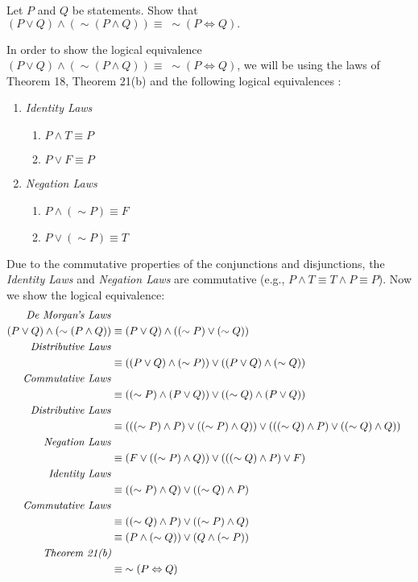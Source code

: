 \documentclass[12pt]{article}
\newenvironment{problem}[2][Problem]{\begin{trivlist}
		\item[\hskip \labelsep {\bfseries #1}\hskip \labelsep {\bfseries #2.}]}{\end{trivlist}}
\newenvironment{solution}[2][Solution]{\begin{trivlist}
		\item[\hskip \labelsep {\bfseries #1}\hskip \labelsep {\bfseries #2.}]}{\end{trivlist}}
\begin{document}
\begin{problem}{62}
	Let $P$ and $Q$ be statements. Show that $(P\vee Q)\wedge (\sim(P \wedge Q))\equiv \; \sim(P\Leftrightarrow Q).$
	\begin{solution}{}
		In order to show the logical equivalence $(P\vee Q)\wedge (\sim(P \wedge Q))\equiv \; \sim(P\Leftrightarrow Q)$, we will be using the laws of Theorem 18, Theorem 21(b) and the following logical equivalences \cite{logicalequiv}:
		\begin{enumerate}
			\item \emph{Identity Laws}
			\begin{enumerate}[label = \alph*]
				\item $P\wedge T \equiv P$
				\item $P \vee F \equiv P$
			\end{enumerate}
			\item \emph{Negation Laws}
			\begin{enumerate}[label = \alph*]
				\item $P \wedge (\sim P) \equiv F$
				\item $P \vee (\sim P) \equiv T$
			\end{enumerate}
		\end{enumerate}
	Due to the commutative properties of the conjunctions and disjunctions, the \emph{Identity Laws} and \emph{Negation Laws} are commutative (e.g., $P\wedge T \equiv T\wedge P\equiv P$). Now we show the logical equivalence:
	\begin{align*}
		\text{\emph{De Morgan's Laws}}\\
		(P\vee Q)\wedge (\sim(P\wedge Q)) & \equiv (P\vee Q)\wedge((\sim P)\vee (\sim Q))\\
		\text{\emph{Distributive Laws}}\\
		& \equiv ((P\vee Q)\wedge (\sim P))\vee ((P\vee Q)\wedge (\sim Q))\\
		\text{\emph{Commutative Laws}}\\
		& \equiv ((\sim P)\wedge (P\vee Q))\vee ((\sim Q)\wedge (P\vee Q))\\
		\text{\emph{Distributive Laws}}\\
		& \equiv (((\sim P)\wedge P)\vee ((\sim P)\wedge Q))\vee (((\sim Q)\wedge P)\vee ((\sim Q)\wedge Q))\\
		\text{\emph{Negation Laws}}\\
			& \equiv (F\vee ((\sim P)\wedge Q))\vee (((\sim Q)\wedge P)\vee F)\\
		\text{\emph{Identity Laws}}\\
			& \equiv ((\sim P)\wedge Q)\vee ((\sim Q)\wedge P)\\
		\text{\emph{Commutative Laws}}\\
		& \equiv ((\sim Q)\wedge P)\vee ((\sim P)\wedge Q)\\
		& \equiv (P\wedge (\sim Q))\vee (Q\wedge (\sim P))\\
		\text{\emph{Theorem 21(b)}}\\
		& \equiv \; \sim(P\Leftrightarrow Q)
	\end{align*}
	\end{solution}
\end{problem}
\end{document}
